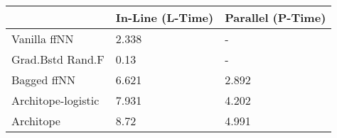 \begin{tabular}{lll}
\toprule
{} & In-Line (L-Time) & Parallel (P-Time) \\
\midrule
Vanilla ffNN       &            2.338 &                 - \\
Grad.Bstd Rand.F   &             0.13 &                 - \\
Bagged ffNN        &            6.621 &             2.892 \\
Architope-logistic &            7.931 &             4.202 \\
Architope          &             8.72 &             4.991 \\
\bottomrule
\end{tabular}
